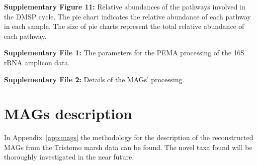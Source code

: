    \textbf{Supplementary Figure 11:} Relative abundances of the pathways involved in the DMSP cycle. The pie chart indicates the relative abundance of each pathway in each sample. The size of pie charts represent the total relative abundance of each pathway. 
    
   \textbf{Supplementary File 1:} The parameters for the PEMA processing of the 16S rRNA amplicon data.
    
   \textbf{Supplementary File 2:} Details of the MAGs’ processing. 
   


\section*{MAGs description}

   In Appendix~\ref{app:mags} the methodology for the description of the reconstructed MAGs 
   from the Tristomo marsh data can be found. 
   The novel taxa found will be thoroughly investigated in the near future. 


